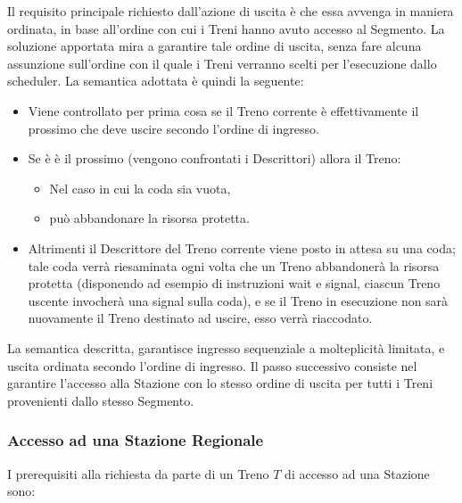 \begin{description}
			Il requisito principale richiesto dall'azione di uscita è che essa avvenga in maniera ordinata, in base all'ordine con cui i Treni hanno avuto accesso al Segmento. La soluzione apportata mira a garantire tale ordine di uscita, senza fare alcuna assunzione sull'ordine con il quale i Treni verranno scelti per l'esecuzione dallo scheduler. La semantica adottata è quindi la seguente:
			\begin{itemize}
				 \item Viene controllato per prima cosa se il Treno corrente è effettivamente il prossimo che deve uscire secondo l'ordine di ingresso.
				 \item Se è è il prossimo (vengono confrontati i Descrittori) allora il Treno:
				 	\begin{itemize} 
				 		\item Nel caso in cui la coda sia vuota, 
				 		\item può abbandonare la risorsa protetta.
				 	\end{itemize} 
				 \item Altrimenti il Descrittore del Treno corrente viene posto in attesa su una coda; tale coda verrà riesaminata ogni volta che un Treno abbandonerà la risorsa protetta (disponendo ad esempio di instruzioni wait e signal, ciascun Treno uscente invocherà una signal sulla coda), e se il Treno in esecuzione non sarà nuovamente il Treno destinato ad uscire, esso verrà riaccodato. 
			\end{itemize}
		\end {description}  
	
	La semantica descritta, garantisce ingresso sequenziale a molteplicità limitata, e uscita ordinata secondo l'ordine di ingresso. Il passo successivo consiste nel garantire l'accesso alla Stazione con lo stesso ordine di uscita per tutti i Treni provenienti dallo stesso Segmento.


		\subsubsection{Accesso ad una Stazione Regionale}
		
		I prerequisiti alla richiesta da parte di un Treno $T$ di accesso ad una Stazione sono:
		
